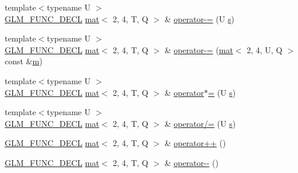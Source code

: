 \begin{DoxyCompactItemize}
\item 
{\footnotesize template$<$typename U $>$ }\\\hyperlink{setup_8hpp_ab2d052de21a70539923e9bcbf6e83a51}{G\+L\+M\+\_\+\+F\+U\+N\+C\+\_\+\+D\+E\+CL} \hyperlink{structglm_1_1mat}{mat}$<$ 2, 4, T, Q $>$ \& \hyperlink{structglm_1_1mat_3_012_00_014_00_01_t_00_01_q_01_4_ac74de81b921e4090b67c3717d9144308}{operator-\/=} (U \hyperlink{_s_d_l__opengl_8h_a4af680a6c683f88ed67b76f207f2e6e4}{s})
\item 
{\footnotesize template$<$typename U $>$ }\\\hyperlink{setup_8hpp_ab2d052de21a70539923e9bcbf6e83a51}{G\+L\+M\+\_\+\+F\+U\+N\+C\+\_\+\+D\+E\+CL} \hyperlink{structglm_1_1mat}{mat}$<$ 2, 4, T, Q $>$ \& \hyperlink{structglm_1_1mat_3_012_00_014_00_01_t_00_01_q_01_4_a8000ab27bcdbf1041cdaaad2c71df7a3}{operator-\/=} (\hyperlink{structglm_1_1mat}{mat}$<$ 2, 4, U, Q $>$ const \&\hyperlink{_s_d_l__opengl__glext_8h_af593500c283bf1a787a6f947f503a5c2}{m})
\item 
{\footnotesize template$<$typename U $>$ }\\\hyperlink{setup_8hpp_ab2d052de21a70539923e9bcbf6e83a51}{G\+L\+M\+\_\+\+F\+U\+N\+C\+\_\+\+D\+E\+CL} \hyperlink{structglm_1_1mat}{mat}$<$ 2, 4, T, Q $>$ \& \hyperlink{structglm_1_1mat_3_012_00_014_00_01_t_00_01_q_01_4_a1cdf73b8ff43f07225b25bce3d2e62ba}{operator$\ast$=} (U \hyperlink{_s_d_l__opengl_8h_a4af680a6c683f88ed67b76f207f2e6e4}{s})
\item 
{\footnotesize template$<$typename U $>$ }\\\hyperlink{setup_8hpp_ab2d052de21a70539923e9bcbf6e83a51}{G\+L\+M\+\_\+\+F\+U\+N\+C\+\_\+\+D\+E\+CL} \hyperlink{structglm_1_1mat}{mat}$<$ 2, 4, T, Q $>$ \& \hyperlink{structglm_1_1mat_3_012_00_014_00_01_t_00_01_q_01_4_afaeb76359d6d5cc1917600e052c4c865}{operator/=} (U \hyperlink{_s_d_l__opengl_8h_a4af680a6c683f88ed67b76f207f2e6e4}{s})
\item 
\hyperlink{setup_8hpp_ab2d052de21a70539923e9bcbf6e83a51}{G\+L\+M\+\_\+\+F\+U\+N\+C\+\_\+\+D\+E\+CL} \hyperlink{structglm_1_1mat}{mat}$<$ 2, 4, T, Q $>$ \& \hyperlink{structglm_1_1mat_3_012_00_014_00_01_t_00_01_q_01_4_ad7e4a06905e2d7bab5a417c3db224ce3}{operator++} ()
\item 
\hyperlink{setup_8hpp_ab2d052de21a70539923e9bcbf6e83a51}{G\+L\+M\+\_\+\+F\+U\+N\+C\+\_\+\+D\+E\+CL} \hyperlink{structglm_1_1mat}{mat}$<$ 2, 4, T, Q $>$ \& \hyperlink{structglm_1_1mat_3_012_00_014_00_01_t_00_01_q_01_4_ad5fe0c9f99081a7811a94e12c4353e5b}{operator-\/-\/} ()
\item 

\end{DoxyCompactItemize}
